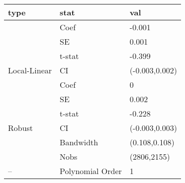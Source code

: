 
\begin{tabular}{lll}
\toprule
type & stat & val\\
\midrule
 & Coef & -0.001\\

 & SE & 0.001\\

 & t-stat & -0.399\\

\multirow{-4}{*}{\raggedright\arraybackslash Local-Linear} & CI & (-0.003,0.002)\\
\cmidrule{1-3}
 & Coef & 0\\

 & SE & 0.002\\

 & t-stat & -0.228\\

\multirow{-4}{*}{\raggedright\arraybackslash Robust} & CI & (-0.003,0.003)\\
\cmidrule{1-3}
 & Bandwidth & (0.108,0.108)\\

 & Nobs & (2806,2155)\\

\multirow{-3}{*}{\raggedright\arraybackslash --} & Polynomial Order & 1\\
\bottomrule
\end{tabular}